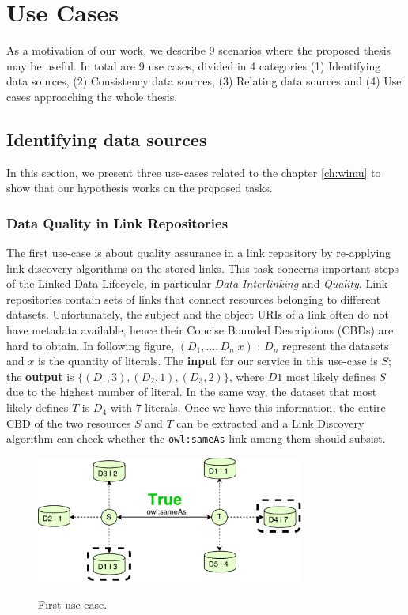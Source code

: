 \section{Use Cases}
As a motivation of our work, we describe 9 scenarios where the proposed thesis may be useful. In total are 9 use cases, divided in 4 categories (1) Identifying data sources, (2) Consistency data sources, (3) Relating data sources and (4) Use cases approaching the whole thesis.


\subsection{Identifying data sources}
 In this section, we present three use-cases related to the chapter \ref{ch:wimu} to show that our hypothesis works on the proposed tasks.

\subsubsection{Data Quality in Link Repositories}

 The first use-case is about quality assurance in a link repository by re-applying link discovery algorithms on the stored links.
This task concerns important steps of the Linked Data Lifecycle, in particular \textit{Data Interlinking} and \textit{Quality}.
 Link repositories contain sets of links that connect resources belonging to different datasets. 
 Unfortunately, the subject and the object URIs of a link often do not have metadata available, hence their Concise Bounded Descriptions (CBDs) are hard to obtain.
 In following figure, $(D_1,...,D_n|x)$ : $D_n$ represent the datasets and $x$ is the quantity of literals. 
 The \textbf{input} for our service in this use-case is $S$; the \textbf{output} is $\{(D_1,3),(D_2,1),(D_3,2)\}$, where $D1$ most likely defines $S$ due to the highest number of literal. 
 In the same way, the dataset that most likely defines $T$ is $D_4$ with 7 literals. 
 Once we have this information, the entire CBD of the two resources $S$ and $T$ can be extracted and a Link Discovery algorithm can check whether the \texttt{owl:sameAs} link among them should subsist.


 \begin{figure}[htb] 
 	\centering
 	\includegraphics[width=250pt]{img/true.pdf}
 	\label{fig:caseTrue}
 	\caption{First use-case.}
 \end{figure}

